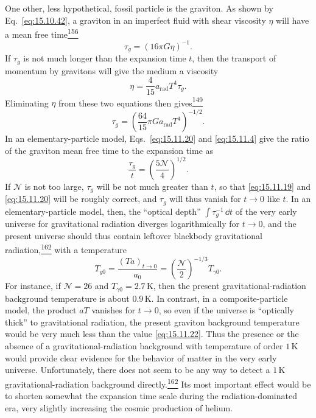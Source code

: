 One other, less hypothetical, fossil particle is the graviton. As shown by
Eq.~\eqref{eq:15.10.42}, a graviton in an imperfect fluid with shear viscosity
\(\eta\) will have a mean free
time\hyperref[ch15-ref-156]{\textsuperscript{156}}
\begin{equation}
  \tau_g=(16\pi G\eta)^{-1}.
  \tag{15.11.18}\label{eq:15.11.18}
\end{equation}
If \(\tau_g\) is not much longer than the expansion time \(t\), then the
transport of momentum by gravitons will give the medium a viscosity
\begin{equation}
  \eta=\frac4{15}a_{\mathrm{rad}}T^4\tau_g.
  \tag{15.11.19}\label{eq:15.11.19}
\end{equation}
Eliminating \(\eta\) from these two equations then
gives\hyperref[ch15-ref-149]{\textsuperscript{149}}
\begin{equation}
  \tau_g
  =
  \left(
    \frac{64}{15}\pi G a_{\mathrm{rad}}T^4
  \right)^{-1/2}.
  \tag{15.11.20}\label{eq:15.11.20}
\end{equation}
In an elementary-particle model, Eqs.~\eqref{eq:15.11.20} and
\eqref{eq:15.11.4} give the ratio of the graviton mean free time to the
expansion time as
\begin{equation}
  \frac{\tau_g}{t}
  =
  \left(\frac{5\mathcal N}{4}\right)^{1/2}.
  \tag{15.11.21}\label{eq:15.11.21}
\end{equation}
If \(\mathcal N\) is not too large, \(\tau_g\) will be not much greater
than \(t\), so that \eqref{eq:15.11.19} and \eqref{eq:15.11.20} will be
roughly correct, and \(\tau_g\) will thus vanish for \(t\to0\) like \(t\).
In an elementary-particle model, then, the ``optical depth''
\(\int\tau_g^{-1}\,\dd t\) of the very early universe for gravitational
radiation diverges logarithmically for \(t\to0\), and the present universe
should thus contain leftover blackbody gravitational
radiation,\hyperref[ch15-ref-162]{\textsuperscript{162}} with a temperature
\begin{equation}
  T_{g0}
  =
  \frac{(Ta)_{t\to0}}{a_0}
  =
  \left(\frac{\mathcal N}{2}\right)^{-1/3}T_{\gamma0}.
  \tag{15.11.22}\label{eq:15.11.22}
\end{equation}
For instance, if \(\mathcal N=26\) and \(T_{\gamma0}=2.7\,\mathrm K\),
then the present gravitational-radiation background temperature is about
\(0.9\,\mathrm K\). In contrast, in a composite-particle model, the product
\(aT\) vanishes for \(t\to0\), so even if the universe is ``optically
thick'' to gravitational radiation, the present graviton background
temperature would be very much less than the value \eqref{eq:15.11.22}.
Thus the presence or the absence of a gravitational-radiation background with
temperature of order \(1\,\mathrm K\) would provide clear evidence for the
behavior of matter in the very early universe. Unfortunately, there does not
seem to be any way to detect a \(1\,\mathrm K\) gravitational-radiation
background directly.\hyperref[ch15-ref-162]{\textsuperscript{162}} Its most
important effect would be to shorten somewhat the expansion time scale during
the radiation-dominated era, very slightly increasing the cosmic production of
helium.


